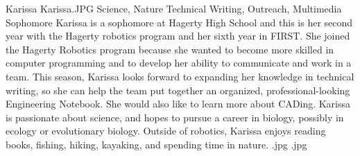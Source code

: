 \insertbio
{Karissa}
{Karissa.JPG}
{Science, Nature}
{Technical Writing, Outreach, Multimedia}
{Sophomore}
{
Karissa is a sophomore at Hagerty High School and this is her second year with the Hagerty robotics program and her sixth year in FIRST. She joined the Hagerty Robotics program because she wanted to become more skilled in computer programming and to develop her ability to communicate and work in a team. This season, Karissa looks forward to expanding her knowledge in technical writing, so she can help the team put together an organized, professional-looking Engineering Notebook. She would also like to learn more about CADing. Karissa is passionate about science, and hopes to pursue a career in biology, possibly in ecology or evolutionary biology. Outside of robotics, Karissa enjoys reading books, fishing, hiking, kayaking, and spending time in nature.
}
{.jpg}
{.jpg}
